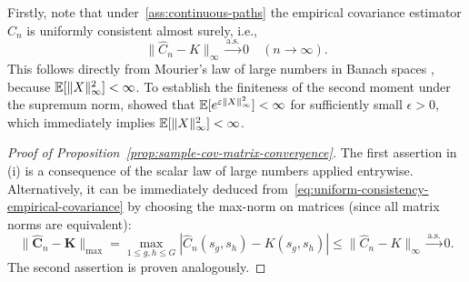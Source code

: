 Firstly, note that under~\ref{ass:continuous-paths} the empirical covariance estimator \(\hat C_n\) is uniformly consistent almost surely, i.e., 
\begin{equation}\label{eq:uniform-consistency-empirical-covariance}
\|\hat C_n - K\|_\infty \stackrel{\text{a.s.}}{\longrightarrow} 0\quad (n\to\infty).
\end{equation}
This follows directly from Mourier's law of large numbers in Banach spaces \citep[Theorem 7.2.1]{laha1979probability}, because \(\mathbb{E}[\|X\|_\infty^2] < \infty\). To establish the finiteness of the second moment under the supremum norm, \citet{landau1970supremum} showed that \(\mathbb{E}[e^{\varepsilon \|X\|_\infty^2}] < \infty\) for sufficiently small \(\epsilon>0\), which immediately implies \(\mathbb{E}[\|X\|_\infty^2] < \infty\).

\begin{proof}[Proof of Proposition~\ref{prop:sample-cov-matrix-convergence}]\label{proof:sample-cov-matrix-convergence}
  The first assertion in (i) is a consequence of the scalar law of large numbers applied entrywise. Alternatively, it can be immediately deduced from~\eqref{eq:uniform-consistency-empirical-covariance} by choosing the max-norm on matrices (since all matrix norms are equivalent):
  \[
  \|\hat{\mathbf C}_n - \mathbf K\|_{\max} = \max_{1\leq g,h\leq G} |\hat C_n(s_g, s_h) - K(s_g, s_h)| \leq \|\hat C_n - K\|_\infty \stackrel{\text{a.s.}}{\longrightarrow} 0.
  \]
  The second assertion is proven analogously.


\end{proof}
